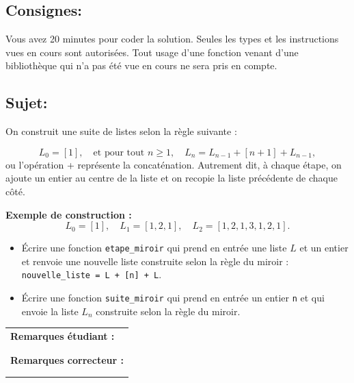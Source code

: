 \documentclass[a4paper,11pt]{article}
\begin{document}
\subsection*{Consignes:} Vous avez 20 minutes pour coder la solution. Seules les types et les instructions vues en cours sont autorisées. Tout usage d'une fonction 
venant d'une bibliothèque qui n'a pas été vue en cours ne sera pris en compte. 


\subsection*{Sujet:}
On construit une suite de listes selon la règle suivante :

\[
L_0 = [1], \quad \text{et pour tout } n \ge 1, \quad L_{n} = L_{n-1} + [n+1] + L_{n-1}, 
\]
 ou l'opération + représente la concaténation. Autrement dit, à chaque étape, on ajoute un entier au centre de la liste et on recopie la liste précédente de chaque côté.

\vspace{0.3 cm}
\textbf{Exemple de construction :}
\[
L_0 = [1], \quad L_1 = [1, 2, 1], \quad L_2 = [1, 2, 1, 3, 1, 2, 1].
\]
\begin{itemize}
\item[1.] Écrire une fonction \texttt{etape\_miroir} qui prend en entrée une liste $L$ et un entier 
    et renvoie une nouvelle liste construite selon la règle du miroir :
    \texttt{nouvelle\_liste = L + [n] + L}.

\item[2.] Écrire une fonction \texttt{suite\_miroir} qui prend en entrée un entier \texttt{n}
   et qui envoie la liste $L_n$ construite selon la règle du miroir. 
\end{itemize}   


\begin{table}[h!]
\centering
\renewcommand{\arraystretch}{1.4} %
\begin{tabular}{|p{15cm}|}
\hline
\textbf{Remarques étudiant :}    \\
 \\
 \\
\hline
\textbf{Remarques correcteur :}  \\
 \\
 \\
\hline
\end{tabular}
\end{table}


\newpage
\end{document}
